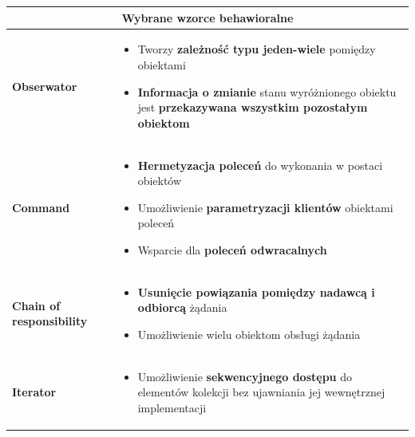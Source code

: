 \documentclass[a4paper]{article}
\begin{document}
    \begin{table}[H]
        \begin{center}
            \begin{tabular}{  p{3cm} p{12cm}  }


                \toprule

                \multicolumn{2}{c}{Wybrane wzorce behawioralne}\\

                \toprule

                \textbf{Obserwator}
                &
                \begin{itemize}
                    \item Tworzy \textbf{zależność typu jeden-wiele} pomiędzy obiektami
                    \item \textbf{Informacja o zmianie} stanu wyróżnionego obiektu jest \textbf{przekazywana wszystkim pozostałym obiektom}
                \end{itemize}
                \\

                \cmidrule(r){1-1}\cmidrule(l){2-2}
                \textbf{Command}
                &
                \begin{itemize}
                    \item \textbf{Hermetyzacja poleceń} do wykonania w postaci obiektów
                    \item Umożliwienie \textbf{parametryzacji klientów} obiektami poleceń
                    \item Wsparcie dla \textbf{poleceń odwracalnych}
                \end{itemize}
                \\

                \cmidrule(r){1-1}\cmidrule(l){2-2}

                \textbf{Chain of responsibility}
                &
                \begin{itemize}
                    \item \textbf{Usunięcie powiązania pomiędzy nadawcą i odbiorcą} żądania
                    \item Umożliwienie wielu obiektom obsługi żądania
                \end{itemize}
                \\

                \cmidrule(r){1-1}\cmidrule(l){2-2}

                \textbf{Iterator}
                &
                \begin{itemize}
                    \item Umożliwienie \textbf{sekwencyjnego dostępu} do elementów kolekcji bez ujawniania jej wewnętrznej implementacji
                \end{itemize}
                \\

                \bottomrule
            \end{tabular}
        \end{center}
    \end{table}
\end{document}
